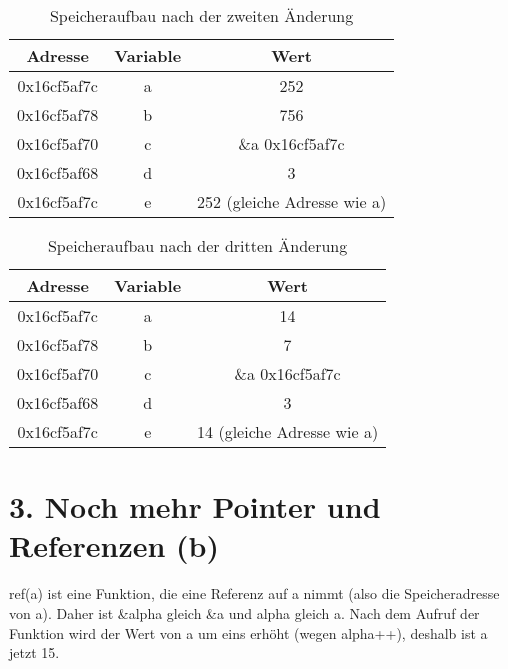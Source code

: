 \documentclass{article}
\begin{document}
\begin{table}[h]
    \centering
    \begin{tabular}{|c|c|c|}
        \hline
        \textbf{Adresse} & \textbf{Variable} & \textbf{Wert}               \\
        \hline
        0x16cf5af7c      & a                 & 252                         \\
        0x16cf5af78      & b                 & 756                         \\
        0x16cf5af70      & c                 & \&a 0x16cf5af7c             \\
        0x16cf5af68      & d                 & 3                           \\
        0x16cf5af7c      & e                 & 252 (gleiche Adresse wie a) \\
        \hline
    \end{tabular}
    \caption{Speicheraufbau nach der zweiten Änderung}
\end{table}

\begin{table}[h]
    \centering
    \begin{tabular}{|c|c|c|}
        \hline
        \textbf{Adresse} & \textbf{Variable} & \textbf{Wert}              \\
        \hline
        0x16cf5af7c      & a                 & 14                         \\
        0x16cf5af78      & b                 & 7                          \\
        0x16cf5af70      & c                 & \&a 0x16cf5af7c            \\
        0x16cf5af68      & d                 & 3                          \\
        0x16cf5af7c      & e                 & 14 (gleiche Adresse wie a) \\
        \hline
    \end{tabular}
    \caption{Speicheraufbau nach der dritten Änderung}
\end{table}

\section*{3. Noch mehr Pointer und Referenzen (b)}

ref(a) ist eine Funktion, die eine Referenz auf a nimmt (also die Speicheradresse von a). Daher ist \&alpha gleich \&a und alpha gleich a. Nach dem Aufruf der Funktion wird der Wert von a um eins erhöht (wegen alpha++), deshalb ist a jetzt 15.
\end{document}
